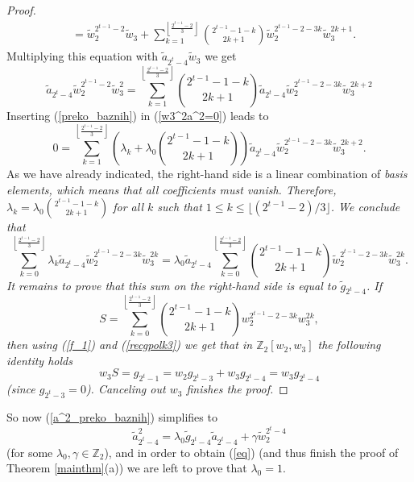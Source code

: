 \documentclass{amsart}
\theoremstyle{definition}
\theoremstyle{remark}
\numberwithin{equation}{section}
\begin{document}
\begin{proof}
\begin{align*}
 &=\widetilde w_2^{2^{t-1}-2}\widetilde w_3+\sum_{k = 1}^{\left\lfloor \frac{2^{t-1}-2}{3} \right\rfloor} \binom{2^{t-1}-1-k}{2k+1}\widetilde w_2^{2^{t-1}-2-3k}\widetilde w_3^{2k+1}.
\end{align*}
Multiplying this equation with $\widetilde a_{2^t-4}\widetilde w_3$ we get
    \begin{equation}\label{preko_baznih}
    \widetilde a_{2^t-4}\widetilde w_2^{2^{t-1}-2} \widetilde w_3^2 = \sum_{k = 1}^{\left\lfloor \frac{2^{t-1}-2}{3} \right\rfloor} \binom{2^{t-1}-1-k}{2k+1} \widetilde a_{2^t-4}\widetilde w_2^{2^{t-1}-2-3k} \widetilde w_3^{2k+2}
    \end{equation}
Inserting (\ref{preko_baznih}) in (\ref{w3^2a^2=0}) leads to
\[0 = \sum_{k=1}^{\left\lfloor \frac{2^{t-1}-2}{3} \right\rfloor} \left(\lambda_k + \lambda_0 \binom{2^{t-1} -1 -k}{2k+1}\right) \widetilde a_{2^t-4} \widetilde w_2^{2^{t-1}-2-3k}\widetilde w_3^{2k+2}.\] 
As we have already indicated, the right-hand side is a linear combination of \em basis \em elements, which means that all coefficients must vanish. Therefore, $\lambda_k = \lambda_0 \binom{2^{t-1} -1 -k}{2k+1}$ for all $k$ such that $1\le k\le\lfloor(2^{t-1}-2)/3\rfloor$. We conclude that 
\[\sum_{k=0}^{\left\lfloor \frac{2^{t-1}-2}{3} \right\rfloor} \lambda_k \widetilde a_{2^t-4} \widetilde w_2^{2^{t-1}-2-3k}\widetilde w_3^{2k}=\lambda_0\widetilde a_{2^t-4} \sum_{k=0}^{\left\lfloor \frac{2^{t-1}-2}{3} \right\rfloor} \binom{2^{t-1} -1 -k}{2k+1} \widetilde w_2^{2^{t-1}-2-3k}\widetilde w_3^{2k}.\]
It remains to prove that this sum on the right-hand side is equal to $\widetilde g_{2^t-4}$. If
\[S = \sum_{k=0}^{\left\lfloor \frac{2^{t-1}-2}{3} \right\rfloor} \binom{2^{t-1} -1 -k}{2k+1} w_2^{2^{t-1}-2-3k}  w_3^{2k},\] 
then using (\ref{f_1}) and (\ref{recgpolk3}) we get that in $\mathbb Z_2[w_2,w_3]$ the following identity holds
\[w_3 S =  g_{2^t-1} = w_2 g_{2^t-3} + w_3 g_{2^t-4} = w_3 g_{2^t-4}\]
(since $g_{2^t-3} = 0$). Canceling out $w_3$ finishes the proof.
\end{proof}

So now (\ref{a^2_preko_baznih}) simplifies to
\begin{equation}\label{eqq}
\widetilde a_{2^t-4}^2=\lambda_0\widetilde g_{2^t-4}\widetilde a_{2^t-4}+\gamma\widetilde w_2^{2^t-4}
\end{equation}
(for some $\lambda_0,\gamma\in\mathbb Z_2$), and in order to obtain (\ref{eq}) (and thus finish the proof of Theorem \ref{mainthm}(a)) we are left to prove that $\lambda_0=1$.
\end{document}
